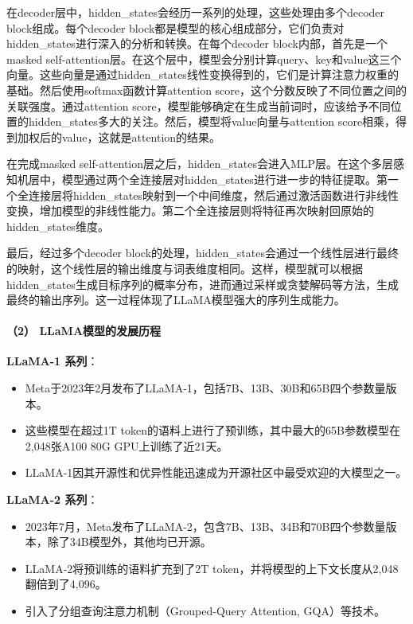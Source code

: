 \documentclass[
]{article}
\providecommand{\tightlist}{%
  \setlength{\itemsep}{0pt}\setlength{\parskip}{0pt}}
\begin{document}
在decoder层中，hidden\_states会经历一系列的处理，这些处理由多个decoder
block组成。每个decoder
block都是模型的核心组成部分，它们负责对hidden\_states进行深入的分析和转换。在每个decoder
block内部，首先是一个masked
self-attention层。在这个层中，模型会分别计算query、key和value这三个向量。这些向量是通过hidden\_states线性变换得到的，它们是计算注意力权重的基础。然后使用softmax函数计算attention
score，这个分数反映了不同位置之间的关联强度。通过attention
score，模型能够确定在生成当前词时，应该给予不同位置的hidden\_states多大的关注。然后，模型将value向量与attention
score相乘，得到加权后的value，这就是attention的结果。

在完成masked
self-attention层之后，hidden\_states会进入MLP层。在这个多层感知机层中，模型通过两个全连接层对hidden\_states进行进一步的特征提取。第一个全连接层将hidden\_states映射到一个中间维度，然后通过激活函数进行非线性变换，增加模型的非线性能力。第二个全连接层则将特征再次映射回原始的hidden\_states维度。

最后，经过多个decoder
block的处理，hidden\_states会通过一个线性层进行最终的映射，这个线性层的输出维度与词表维度相同。这样，模型就可以根据hidden\_states生成目标序列的概率分布，进而通过采样或贪婪解码等方法，生成最终的输出序列。这一过程体现了LLaMA模型强大的序列生成能力。

\paragraph{（2）
LLaMA模型的发展历程}\label{llamaux6a21ux578bux7684ux53d1ux5c55ux5386ux7a0b}

\textbf{LLaMA-1 系列}：

\begin{itemize}
\tightlist
\item
  Meta于2023年2月发布了LLaMA-1，包括7B、13B、30B和65B四个参数量版本。
\item
  这些模型在超过1T
  token的语料上进行了预训练，其中最大的65B参数模型在2,048张A100 80G
  GPU上训练了近21天。
\item
  LLaMA-1因其开源性和优异性能迅速成为开源社区中最受欢迎的大模型之一。
\end{itemize}

\textbf{LLaMA-2 系列}：

\begin{itemize}
\tightlist
\item
  2023年7月，Meta发布了LLaMA-2，包含7B、13B、34B和70B四个参数量版本，除了34B模型外，其他均已开源。
\item
  LLaMA-2将预训练的语料扩充到了2T
  token，并将模型的上下文长度从2,048翻倍到了4,096。
\item
  引入了分组查询注意力机制（Grouped-Query Attention, GQA）等技术。
\end{itemize}
\end{document}
